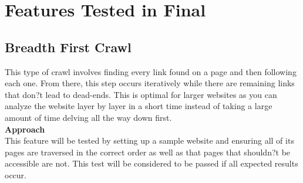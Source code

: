 \documentclass[12pt, titlepage]{article}
\begin{document}
\section{Features Tested in Final}




\subsection{Breadth First Crawl}
This type of crawl involves finding every link found on a page and then following each one. From there, this step occurs iteratively while there are remaining links that don?t lead to dead-ends. This is optimal for larger websites as you can analyze the website layer by layer in a short time instead of taking a large amount of time delving all the way down first.\\

\textbf{Approach}\\
This feature will be tested by setting up a sample website and ensuring all of its pages are traversed in the correct order as well as that pages that shouldn?t be accessible are not. This test will be considered to be passed if all expected results occur.\\
\end{document}
